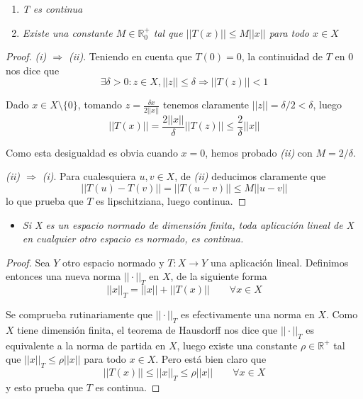 \documentclass[a4paper, 12pt]{article}
\begin{document}
\begin{enumerate}[label=\textbf{\arabic*}.]
\begin{enumerate}[label=\textit{\alph*})]
\begin{itemize}
				\begin{enumerate}[label=(\textit{\roman*})]
					\item \textit{T es continua}
					\item \textit{Existe una constante \(M \in \mathbb{R}_0^+\) tal que \(||T(x)|| \leq M ||x||\) para todo \(x \in X\)}
				\end{enumerate}
			\end{itemize}
			
			\begin{proof}
			\textit{(i) \(\Rightarrow\) (ii)}. Teniendo en cuenta que \(T(0) = 0\), la continuidad de \(T\) en 0 nos dice que
			\[
				\exists \delta > 0 : z \in X, ||z|| \leq \delta \Rightarrow ||T(z)|| < 1
			\]
			
			Dado \(x \in X \setminus \{0\}\), tomando \(z = \frac{\delta x}{2 ||x||}\) tenemos claramente \(||z|| = \delta / 2 < \delta\), luego
			\[
				||T(x)|| = \frac{2 ||x||}{\delta} ||T(z)|| \leq \frac{2}{\delta} ||x||
			\]
			
			Como esta desigualdad es obvia cuando \(x=0\), hemos probado \textit{(ii)} con \(M = 2 / \delta\).
			
			\textit{(ii) \(\Rightarrow\) (i)}. Para cualesquiera \(u,v \in X\), de \textit{(ii)} deducimos claramente que
			\[
				||T(u) - T(v)|| = ||T(u-v)|| \leq M ||u - v||
			\]
			lo que prueba que \(T\) es lipschitziana, luego continua.
			\end{proof}
			
			\begin{itemize}
				\item \textit{Si X es un espacio normado de dimensión finita, toda aplicación lineal de X en cualquier otro espacio es normado, es continua.}
			\end{itemize}
			
			\begin{proof}
			Sea \(Y\) otro espacio normado y \(T: X \rightarrow Y\) una aplicación lineal. Definimos entonces una nueva norma \(||\cdot ||_T\) en \(X\), de la siguiente forma
			\[
				||x||_T = ||x|| + ||T(x)|| \qquad \forall x \in X
			\]
			
			Se comprueba rutinariamente que \(||\cdot||_T\) es efectivamente una norma en \(X\). Como \(X\) tiene dimensión finita, el teorema de Hausdorff nos dice que \(||\cdot||_T\) es equivalente a la norma de partida en \(X\), luego existe una constante \(\rho \in \mathbb{R}^+\) tal que \(||x||_T \leq \rho ||x||\) para todo \(x \in X\). Pero está bien claro que 
			\[
				||T(x)|| \leq ||x||_T \leq \rho ||x|| \qquad \forall x \in X
			\]
			y esto prueba que \(T\) es continua.
			\end{proof}
		\end{enumerate}
\end{enumerate}
\end{document}
